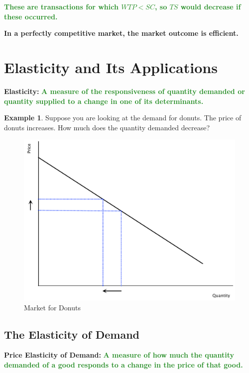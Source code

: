 \documentclass[11pt]{article}\usepackage[]{graphicx}\usepackage[]{color}
\theoremstyle{definition}
\newtheorem{exmp}{Example}[section]
\newcommand{\ddp}[1]{{\textbf{\textcolor{ForestGreen}{#1}}}}
\newcommand{\defn}[1]{\textbf{#1}}
\begin{document}
	\ddp{These are transactions for which $WTP<SC$, so $TS$ would decrease if these occurred.\\}		

	\textbf{In a perfectly competitive market, the market outcome is efficient.}
	
\newpage
	
	\section{Elasticity and Its Applications}
	
	\defn{Elasticity:} \ddp{A measure of the responsiveness of quantity demanded or quantity supplied to a change in one of its determinants.}
	
	\begin{exmp} 
		Suppose you are looking at the demand for donuts. The price of donuts increases. How much does the quantity demanded decrease?
		
			\begin{figure}[H]
				\centering
				\includegraphics[scale=.40]{plot22.pdf}
				\caption{Market for Donuts}
			\end{figure}
		
	\end{exmp}

	\subsection{The Elasticity of Demand}
	
	\defn{Price Elasticity of Demand:} \ddp{A measure of how much the quantity demanded of a good responds to a change in the price of that good.}
	
\end{document}

